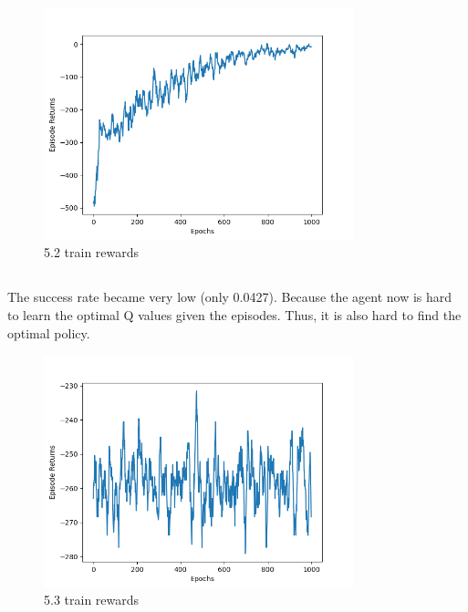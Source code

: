 \documentclass[12pt]{article}
\begin{document}
\subsection{}
\begin{figure}[H]
    \centering
    \includegraphics[width=0.8\textwidth]{imgs/q2.png}
    \caption{5.2 train rewards}
\end{figure}

\subsection{}
The success rate became very low (only 0.0427). Because the agent now is hard to learn the optimal Q values given the episodes. Thus, it is also hard to find the optimal policy.
\begin{figure}[H]
    \centering
    \includegraphics[width=0.8\textwidth]{imgs/q3.png}
    \caption{5.3 train rewards}
\end{figure}
\end{document}
